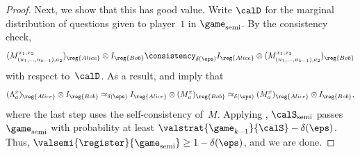 \begin{proof}
Next, we show that this has good value.
Write $\calD$ for the marginal distribution of questions given to player~$1$ in $\game_{\mathrm{semi}}$.
By the consistency check,
\begin{equation*}
(M_{(u_1, \ldots, u_{k-1}),a_2}^{x_1, x_2})_{\reg{Alice}} \otimes I_{\reg{Bob}}
\consistency_{\delta(\eps)} I_{\reg{Alice}} \otimes (M_{(u_1, \ldots, u_{k-1}),a_2}^{x_1, x_2})_{\reg{Bob}}
\end{equation*}
with respect to~$\calD$.
As a result,  and  imply that
\begin{equation*}
(\Lambda_a^x)_{\reg{Alice}} \otimes I_{\reg{Bob}}
\approx_{\delta(\eps)} I_{\reg{Alice}} \otimes (M_a^x)_{\reg{Bob}}
\approx_{\delta(\eps)} (M_a^x)_{\reg{Alice}} \otimes I_{\reg{Bob}},
\end{equation*}
where the last step uses the self-consistency of~$M$.
Applying , $\calS_{\mathrm{semi}}$ passes $\game_{\mathrm{semi}}$ with probability at least $\valstrat{\game_{k-1}}{\calS} - \delta(\eps)$.  
Thus, $\valsemi{\register}{\game_{\mathrm{semi}}} \geq 1 - \delta(\eps)$, and we are done.
\end{proof}



\def\bpm#1\epm{}

